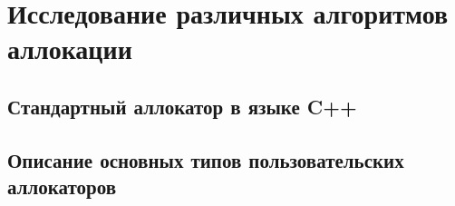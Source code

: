 \documentclass[coursework]{SCWorks}
\begin{document}

\date{2026}

\maketitle

\secNumbering

\tableofcontents






\intro


\section{Исследование различных алгоритмов аллокации}

\subsection{Стандартный аллокатор в языке C++}


\subsection{Описание основных типов пользовательских аллокаторов}
\end{document}
